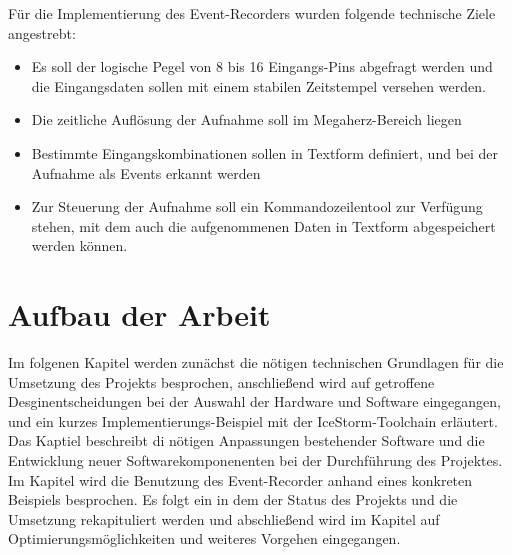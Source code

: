 Für die Implementierung des Event-Recorders wurden folgende technische Ziele angestrebt:
\begin{itemize}
\item Es soll der logische Pegel von 8 bis 16 Eingangs-Pins abgefragt werden und die Eingangsdaten sollen mit einem stabilen Zeitstempel versehen werden.
\item Die zeitliche Auflösung der Aufnahme soll im Megaherz-Bereich liegen
\item Bestimmte Eingangskombinationen sollen in Textform definiert, und bei der Aufnahme als Events erkannt werden
\item Zur Steuerung der Aufnahme soll ein Kommandozeilentool zur Verfügung stehen, mit dem auch die aufgenommenen Daten in Textform abgespeichert werden können.
\end{itemize} 

\section{Aufbau der Arbeit}
\label{ch:Einfuehrung:Aufbau}

Im folgenen Kapitel  werden zunächst die nötigen technischen Grundlagen für die Umsetzung des Projekts besprochen, anschließend wird auf getroffene Desginentscheidungen bei der Auswahl der Hardware und Software eingegangen, und ein kurzes Implementierungs-Beispiel mit der IceStorm-Toolchain erläutert.
Das Kaptiel  beschreibt di nötigen Anpassungen bestehender Software und die Entwicklung neuer Softwarekomponenenten bei der Durchführung des Projektes.
Im Kapitel  wird die Benutzung des Event-Recorder anhand eines konkreten Beispiels besprochen.
Es folgt ein  in dem der Status des Projekts und die Umsetzung rekapituliert werden und abschließend wird im Kapitel  auf Optimierungsmöglichkeiten und weiteres Vorgehen eingegangen.





